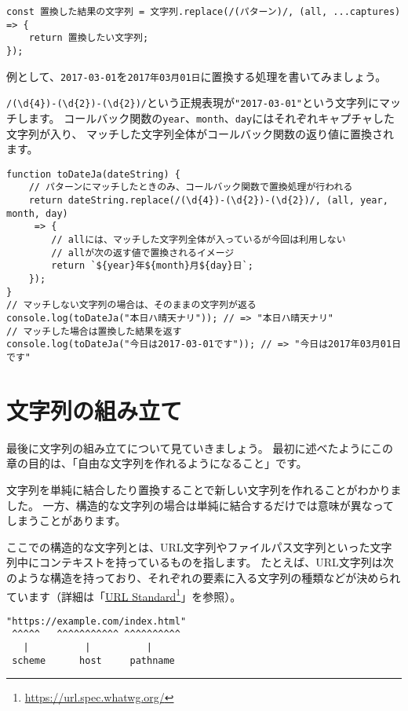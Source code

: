 \begin{lstlisting}
const 置換した結果の文字列 = 文字列.replace(/(パターン)/, (all, ...captures) => {
    return 置換したい文字列;
});
\end{lstlisting}

例として、\texttt{2017-03-01}を\texttt{2017年03月01日}に置換する処理を書いてみましょう。

\texttt{/(\textbackslash d\{4\})-(\textbackslash d\{2\})-(\textbackslash d\{2\})/}という正規表現が\texttt{"2017-03-01"}という文字列にマッチします。
コールバック関数の\texttt{year}、\texttt{month}、\texttt{day}にはそれぞれキャプチャした文字列が入り、
マッチした文字列全体がコールバック関数の返り値に置換されます。

\begin{lstlisting}
function toDateJa(dateString) {
    // パターンにマッチしたときのみ、コールバック関数で置換処理が行われる
    return dateString.replace(/(\d{4})-(\d{2})-(\d{2})/, (all, year, month, day)
     => {
        // allには、マッチした文字列全体が入っているが今回は利用しない
        // allが次の返す値で置換されるイメージ
        return `${year}年${month}月${day}日`;
    });
}
// マッチしない文字列の場合は、そのままの文字列が返る
console.log(toDateJa("本日ハ晴天ナリ")); // => "本日ハ晴天ナリ"
// マッチした場合は置換した結果を返す
console.log(toDateJa("今日は2017-03-01です")); // => "今日は2017年03月01日です"
\end{lstlisting}

\hypertarget{built}{%
\section{文字列の組み立て}\label{built}}

最後に文字列の組み立てについて見ていきましょう。
最初に述べたようにこの章の目的は、「自由な文字列を作れるようになること」です。

文字列を単純に結合したり置換することで新しい文字列を作れることがわかりました。
一方、構造的な文字列の場合は単純に結合するだけでは意味が異なってしまうことがあります。

ここでの構造的な文字列とは、URL文字列やファイルパス文字列といった文字列中にコンテキストを持っているものを指します。
たとえば、URL文字列は次のような構造を持っており、それぞれの要素に入る文字列の種類などが決められています（詳細は「\href{https://url.spec.whatwg.org/}{URL
Standard}\footnote{\url{https://url.spec.whatwg.org/}}」を参照）。

\begin{lstlisting}
"https://example.com/index.html"
 ^^^^^   ^^^^^^^^^^^ ^^^^^^^^^^   
   |          |     　　　|
 scheme      host     pathname
\end{lstlisting}

